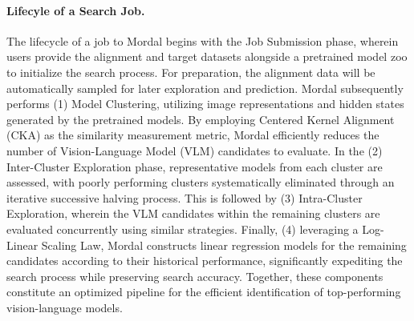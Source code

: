 \paragraph{Lifecyle of a Search Job.}
The lifecycle of a job to Mordal begins with the Job Submission phase, wherein users provide the alignment and target datasets alongside a pretrained model zoo to initialize the search process. For preparation, the alignment data will be automatically sampled for later exploration and prediction.  
Mordal subsequently performs (1) Model Clustering, utilizing image representations and hidden states generated by the pretrained models. 
By employing Centered Kernel Alignment (CKA) as the similarity measurement metric, Mordal efficiently reduces the number of Vision-Language Model (VLM) candidates to evaluate. 
In the (2) Inter-Cluster Exploration phase, representative models from each cluster are assessed, with poorly performing clusters systematically eliminated through an iterative successive halving process. 
This is followed by (3) Intra-Cluster Exploration, wherein the VLM candidates within the remaining clusters are evaluated concurrently using similar strategies. 
Finally, (4) leveraging a Log-Linear Scaling Law, Mordal constructs linear regression models for the remaining candidates according to their historical performance, significantly expediting the search process while preserving search accuracy. 
Together, these components constitute an optimized pipeline for the efficient identification of top-performing vision-language models.
